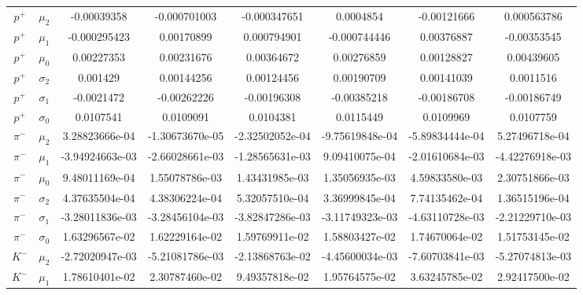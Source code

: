 \begin{landscape}
\begin{table}
\begin{tabular}{c|c|c|c|c|c|c|c}
     $p^+$ & $\mu_2$ & -0.00039358 &       -0.000701003 &       -0.000347651 &          0.0004854 &        -0.00121666  &       0.000563786 \\
     $p^+$ & $\mu_1$ & -0.000295423 &         0.00170899 &        0.000794901 &       -0.000744446 &         0.00376887 &        -0.00353545 \\
     $p^+$ & $\mu_0$ & 0.00227353 &         0.00231676 &         0.00364672 &         0.00276859 &         0.00128827 &          0.00439605 \\
  $p^+$ & $\sigma_2$ & 0.001429 &         0.00144256 &         0.00124456 &         0.00190709 &         0.00141039 &          0.0011516 \\
  $p^+$ & $\sigma_1$ & -0.0021472 &        -0.00262226 &        -0.00196308 &        -0.00385218 &        -0.00186708 &        -0.00186749 \\
  $p^+$ & $\sigma_0$ & 0.0107541 &          0.0109091 &          0.0104381 &          0.0115449 &          0.0109969 &          0.0107759 \\
      $\pi^-$ & $\mu_2$ & 3.28823666e-04 &    -1.30673670e-05 &    -2.32502052e-04 &    -9.75619848e-04 &    -5.89834444e-04 &     5.27496718e-04 \\
      $\pi^-$ & $\mu_1$ & -3.94924663e-03 &    -2.66028661e-03 &    -1.28565631e-03 &     9.09410075e-04 &    -2.01610684e-03 &    -4.42276918e-03 \\
      $\pi^-$ & $\mu_0$ & 9.48011169e-04 &     1.55078786e-03 &     1.43431985e-03 &     1.35056935e-03 &     4.59833580e-03 &     2.30751866e-03 \\
   $\pi^-$ & $\sigma_2$ & 4.37635504e-04 &     4.38306224e-04 &    5.32057510e-04 &     3.36999845e-04 &     7.74135462e-04 &     1.36515196e-04 \\
   $\pi^-$ & $\sigma_1$ & -3.28011836e-03 &    -3.28456104e-03 &    -3.82847286e-03 &     -3.11749323e-03 &    -4.63110728e-03 &    -2.21229710e-03 \\
   $\pi^-$ & $\sigma_0$ & 1.63296567e-02 &     1.62229164e-02 &    1.59769911e-02 &     1.58803427e-02 &     1.74670064e-02 &     1.51753145e-02 \\
       $K^-$ & $\mu_2$ & -2.72020947e-03 &    -5.21081786e-03 &    -2.13868763e-02 &    -4.45600034e-03 &    -7.60703841e-03 &    -5.27074813e-03 \\
       $K^-$ & $\mu_1$ & 1.78610401e-02 &      2.30787460e-02 &     9.49357818e-02 &     1.95764575e-02 &     3.63245785e-02 &     2.92417500e-02 \\

\end{tabular}
\end{table}
\end{landscape}
